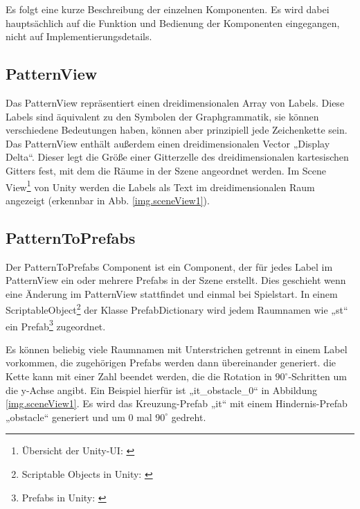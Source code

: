 
Es folgt eine kurze Beschreibung der einzelnen Komponenten. Es wird dabei hauptsächlich auf die Funktion und Bedienung der Komponenten eingegangen, nicht auf Implementierungsdetails.

\subsection{PatternView}\label{ss.patternView}

Das PatternView repräsentiert einen dreidimensionalen Array von Labels. Diese Labels sind äquivalent zu den Symbolen der Graphgrammatik, sie können verschiedene Bedeutungen haben, können aber prinzipiell jede Zeichenkette sein. Das PatternView enthält außerdem einen dreidimensionalen Vector „Display Delta“. Dieser legt die Größe einer Gitterzelle des dreidimensionalen kartesischen Gitters fest, mit dem die Räume in der Szene angeordnet werden. Im Scene View\footnote{Übersicht der Unity-UI: \cite[Seite: LearningtheInterface]{unityManual}} von Unity werden die Labels als Text im dreidimensionalen Raum angezeigt (erkennbar in Abb. \ref{img.sceneView1}).


\subsection{PatternToPrefabs}

Der PatternToPrefabs Component ist ein Component, der für jedes Label im PatternView ein oder mehrere Prefabs in der Szene erstellt. Dies geschieht wenn eine Änderung im PatternView stattfindet und einmal bei Spielstart. In einem ScriptableObject\footnote{Scriptable Objects in Unity: \cite[Seite: class-ScriptableObject]{unityManual}} der Klasse PrefabDictionary wird jedem Raumnamen wie „st“ ein Prefab\footnote{Prefabs in Unity: \cite[Seite: LearningtheInterface]{unityManual}} zugeordnet. 

Es können beliebig viele Raumnamen mit Unterstrichen getrennt in einem Label vorkommen, die zugehörigen Prefabs werden dann übereinander generiert. die Kette kann mit einer Zahl beendet werden, die die Rotation in $90^\circ$-Schritten um die y-Achse angibt. Ein Beispiel hierfür ist „it\_obstacle\_0“ in Abbildung \ref{img.sceneView1}. Es wird das Kreuzung-Prefab „it“ mit einem Hindernis-Prefab „obstacle“ generiert und um 0 mal $90^\circ$ gedreht.


